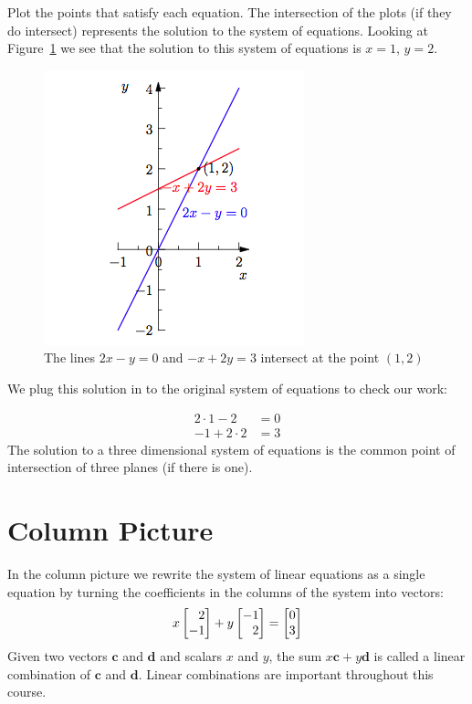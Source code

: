 \documentclass{ximera}
\begin{document}
Plot the points that satisfy each equation. The intersection of the
plots (if they do intersect) represents the solution to the system of
equations. Looking at Figure~\ref{fig:intplot} we see that the
solution to this system of equations is $x = 1$, $y = 2$.

\begin{figure}[H]\label{fig:intplot}
\begin{image}
\includegraphics{Geometry1.png}
\end{image}
\caption{The lines $2x - y = 0$ and $-x + 2y = 3$ intersect at the
  point $(1, 2)$}
\end{figure}

We plug this solution in to the original system of equations to check
our work:

\begin{align*}
2\cdot1-2 &= 0\\
-1+2\cdot2 &= 3
\end{align*}
The solution to a three dimensional system of equations is the common
point of intersection of three planes (if there is one).

\section*{Column Picture}

In the column picture we rewrite the system of linear equations as a
single equation by turning the coefficients in the columns of the
system into vectors:
\[
x\begin{bmatrix}\phantom{-} 2\\-1\end{bmatrix} + y\begin{bmatrix}-1\\\phantom{-}
  2\end{bmatrix} = \begin{bmatrix}0\\3\end{bmatrix}
\]
Given two vectors $\mathbf{c}$ and $\mathbf{d}$ and scalars $x$ and
$y$, the sum $x\mathbf{c} + y\mathbf{d}$ is called a linear
combination of $\mathbf{c}$ and $\mathbf{d}$. Linear combinations are
important throughout this course.
\end{document}
